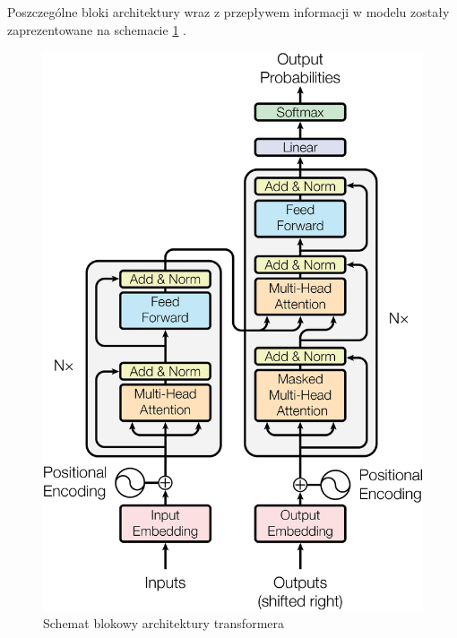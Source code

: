 \documentclass[12pt,a4paper,oneside]{book}
\begin{document}
Poszczególne bloki architektury wraz z przepływem informacji w modelu zostały zaprezentowane na schemacie \ref{fig:transformer_architecture} \cite{vaswani2023attentionneed}.

\begin{figure}[h]
    \centering
	\includegraphics[scale=0.20]{figs/architecture.png}
	\caption{Schemat blokowy architektury transformera}
	\label{fig:transformer_architecture}
\end{figure}



\end{document}
